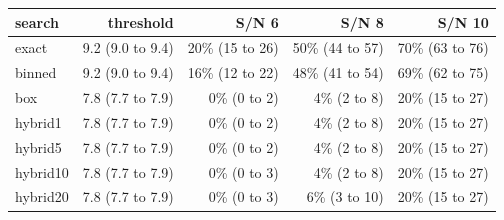 \begin{tabular}{lrrrr}
\toprule
search & threshold & S/N 6 & S/N 8 & S/N 10 \\
\midrule
exact & 9.2 (9.0 to 9.4) & 20\% (15 to 26) & 50\% (44 to 57) & 70\% (63 to 76) \\
binned & 9.2 (9.0 to 9.4) & 16\% (12 to 22) & 48\% (41 to 54) & 69\% (62 to 75) \\
box & 7.8 (7.7 to 7.9) & 0\% (0 to 2) & 4\% (2 to 8) & 20\% (15 to 27) \\
hybrid1 & 7.8 (7.7 to 7.9) & 0\% (0 to 2) & 4\% (2 to 8) & 20\% (15 to 27) \\
hybrid5 & 7.8 (7.7 to 7.9) & 0\% (0 to 2) & 4\% (2 to 8) & 20\% (15 to 27) \\
hybrid10 & 7.8 (7.7 to 7.9) & 0\% (0 to 3) & 4\% (2 to 8) & 20\% (15 to 27) \\
hybrid20 & 7.8 (7.7 to 7.9) & 0\% (0 to 3) & 6\% (3 to 10) & 20\% (15 to 27) \\
\bottomrule
\end{tabular}
